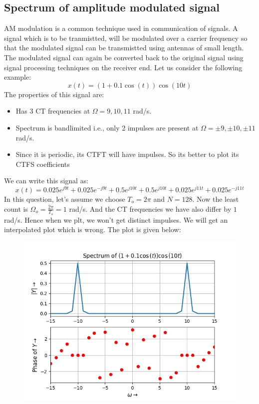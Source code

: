 \documentclass[12pt, a4paper]{article}
\begin{document}
\subsection{Spectrum of amplitude modulated signal}
AM modulation is a common technique used in communication of signals. A signal which is to be tranmistted, will be modulated over a carrier frequency so that the modulated signal can be transmistted using antennas of small length. The modulated signal can again be converted back to the original signal using signal processing techniques on the receiver end. Let us consider the following example:
\begin{equation*}
    x(t) = (1+0.1\cos(t))\cos(10t)
\end{equation*}
The properties of this signal are:
\begin{itemize}
    \item Has 3 CT frequencies at $\Omega = 9,10,11$ rad/s.
    \item Spectrum is bandlimited i.e., only 2 impulses are present at $\Omega = \pm 9,\pm 10, \pm 11$ rad/s.
    \item Since it is periodic, its CTFT will have impulses. So its better to plot its CTFS coefficients
\end{itemize}
We can write this signal as:
\begin{equation*}
    x(t) = 0.025e^{j9t} + 0.025e^{-j9t} + 0.5e^{j10t} + 0.5e^{j10t} + 0.025e^{j11t} + 0.025e^{-j11t}
\end{equation*}
In this question, let's assume we choose $T_{o}=2\pi$ and $N=128$. Now the least count is $\Omega_{o} = \frac{2\pi}{T_{o}} = 1$ rad/s. And the CT frequencies we have also differ by $1$ rad/s. Hence when we plt, we won't get distinct impulses. We will get an interpolated plot which is wrong. The plot is given below:
\vspace*{-0.5cm}
\begin{figure}[H]
    \centering
    \includegraphics[scale = 0.8]{Figure_3.png}
    \label{fig:sample}
\end{figure}
\end{document}
